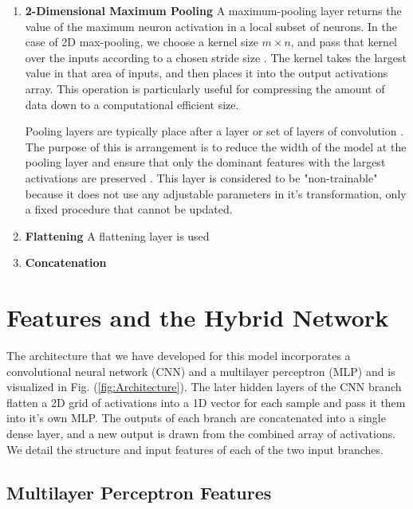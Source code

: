 \documentclass[conference,onecolumn,letterpaper]{IEEEtran}
\begin{document}
\begin{enumerate}
\item\textbf{2-Dimensional Maximum Pooling}
A maximum-pooling layer returns the value of the maximum neuron activation in a local subset of neurons. In the case of 2D max-pooling, we choose a kernel size $m \times n$, and pass that kernel over the inputs according to a chosen stride size \cite{Tensorflow}. The kernel takes the largest value in that area of inputs, and then places it into the output activations array. This operation is particularly useful for compressing the amount of data down to a computational efficient size.

Pooling layers are typically place after a layer or set of layers of convolution \cite{Loy}. The purpose of this is arrangement is to reduce the width of the model at the pooling layer and ensure that only the dominant features with the largest activations are preserved \cite{Geron,Loy}. This layer is considered to be "non-trainable" because it does not use any adjustable parameters in it's transformation, only a fixed procedure that cannot be updated.

\item\textbf{Flattening}
A flattening layer is used 

\item\textbf{Concatenation}


\end{enumerate}


\section{Features and the Hybrid Network}
\label{sec:Features}

The architecture that we have developed for this model incorporates a convolutional neural network (CNN) and a multilayer perceptron (MLP) and is visualized in Fig. (\ref{fig:Architecture}). The later hidden layers of the CNN branch flatten a 2D grid of activations into a 1D vector for each sample and pass it them into it's own MLP. The outputs of each branch are concatenated into a single dense layer, and a new output is drawn from the combined array of activations. We detail the structure and input features of each of the two input branches.


\subsection{Multilayer Perceptron Features}
\label{subsec:FeaturesMLP}
\end{document}
